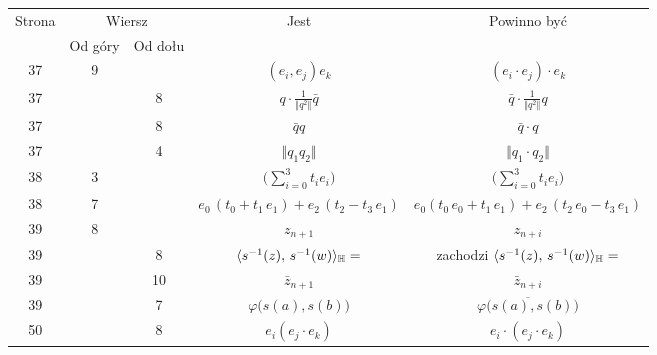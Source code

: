 \documentclass[a4paper,11pt]{article}
\numberwithin{equation}{section}
\begin{document}
\begin{center}
  \begin{tabular}{|c|c|c|c|c|}
    \hline
    Strona & \multicolumn{2}{c|}{Wiersz} & Jest
    & Powinno być \\ \cline{2-3}
           & Od góry & Od dołu & & \\
    \hline
    37  &  9 & & $( e_{ i }, e_{ j } ) e_{ k }$
           & $( e_{ i } \cdot e_{ j } ) \cdot e_{ k }$ \\
    37  & &  8 & $q \cdot \frac{ 1 }{ \Vert q^{ 2 } \Vert } \bar{q}$
           & $\bar{q} \cdot \frac{ 1 }{ \Vert q^{ 2 } \Vert } q$ \\
    37  & &  8 & $\bar{q} q$ & $\bar{q} \cdot q$ \\
    37  & &  4 & $\Vert q_{ 1 } q_{ 2 } \Vert$ & $\Vert q_{ 1 } \cdot q_{ 2 } \Vert$ \\
    38  &  3 & & $\displaystyle \big( \sum_{ i = 0 }^{ 3 } t_{ i } e_{ i } )$
           & $\displaystyle \big( \sum_{ i = 0 }^{ 3 } t_{ i } e _{ i } \big)$ \\
    38  &  7 & & $e_{ 0 } \, ( t_{ 0 } + t_{ 1 } \, e_{ 1 } )
                 + e_{ 2 } \, ( t_{ 2 } - t_{ 3 } \, e_{ 1 } )$
           & $e_{ 0 } ( t_{ 0 } \, e_{ 0 } + t_{ 1 } \, e_{ 1 } )
             + e_{ 2 } \, ( t_{ 2 } \, e_{ 0 } - t_{ 3 } \, e_{ 1 } )$ \\
    39  &  8 & & $z_{ n + 1 }$ & $z_{ n + i }$ \\
    39  & &  8 & $\langle s^{ -1 }( z ), \, s^{ -1 }( w ) \rangle_{ \mathbb{H} } =$
           & zachodzi $\langle s^{ -1 }( z ), \, s^{ -1 }( w ) \rangle_{ \mathbb{H} } =$ \\
    39  & & 10 & $\bar{z}_{ n + 1 }$ & $\bar{z}_{ n + i }$ \\
    39  & &  7 & $\varphi\big( s( a ), s( b ) \big)$
           & $\overline{ \varphi\big( s( a ), s( b ) \big) }$ \\
    50  & &  8 & $e_{ i } ( e_{ j } \cdot e_{ k } )$
           & $e_{ i } \cdot ( e_{ j } \cdot e_{ k } )$ \\
    \hline
  \end{tabular}






\end{center}
\end{document}
